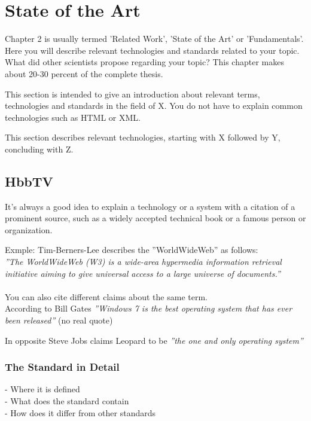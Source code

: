 \chapter{State of the Art\label{cha:chapter2}}

Chapter 2 is usually termed 'Related Work', 'State of the Art' or 'Fundamentals'. Here you will describe
relevant technologies and standards related to your topic. What did other scientists propose regarding
your topic? This chapter makes about 20-30 percent of the complete thesis.

This section is intended to give an introduction about relevant terms, technologies
and standards in the field of X. You do not have to explain common technologies such
as HTML or XML.

This section describes relevant technologies, starting with X followed by Y, concluding with Z.

\section{HbbTV\label{sec:hbbtv}}

It's always a good idea to explain a technology or a system with a citation of a prominent
source, such as a widely accepted technical book or a famous person or organization.

Exmple: Tim-Berners-Lee describes the ''WorldWideWeb'' as follows:\\
\textit{''The WorldWideWeb (W3) is a wide-area hypermedia information retrieval initiative
aiming to give universal access to a large universe of documents.''} \cite{timwww}\\
\\
You can also cite different claims about the same term.\\

According to Bill Gates
\textit{''Windows 7 is the best operating system that has ever been released''} \cite{billgates} (no real quote)

In opposite Steve Jobs claims Leopard to be
\textit{''the one and only operating system''} \cite{stevejobs}

\subsection{The Standard in Detail\label{sec:hbbtvstandard}}

- Where it is defined\\
- What does the standard contain\\
- How does it differ from other standards

